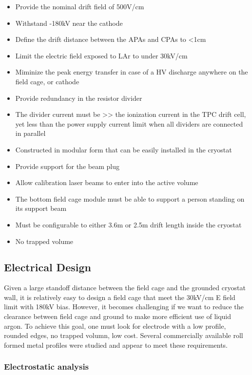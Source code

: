\begin{itemize}
\item Provide the nominal drift field of 500V/cm 
\item Withstand -180kV near the cathode
\item Define the drift distance between the APAs and CPAs to <1cm
\item Limit the electric field exposed to LAr to under 30kV/cm
\item Miminize the peak energy transfer in case of a HV discharge anywhere on the field cage, or cathode
\item Provide redundancy in the resistor divider
\item The divider current must be >> the ionization current in the TPC drift cell, yet less than the power supply current limit when all dividers are connected in parallel
\item Constructed in modular form that can be easily installed in the cryostat
\item Provide support for the beam plug
\item Allow calibration laser beams to enter into the active volume 
\item The bottom field cage module must be able to support a person standing on its support beam
\item Must be configurable to either 3.6m or 2.5m drift length inside the cryostat
\item No trapped volume

\end{itemize}

\subsection{Electrical Design}

Given a large standoff distance between the field cage and the grounded cryostat wall, it is relatively easy to design a field cage that meet the 30kV/cm E field limit with 180kV bias.  However, it becomes challenging if we want to reduce the clearance between field cage and ground to make more efficient use of liquid argon.  To achieve this goal, one must look for electrode with a low profile, rounded edges, no trapped volumn, low cost.  Several commercially available roll formed metal profiles were studied and appear to meet these requirements. 


\subsubsection{Electrostatic analysis}

